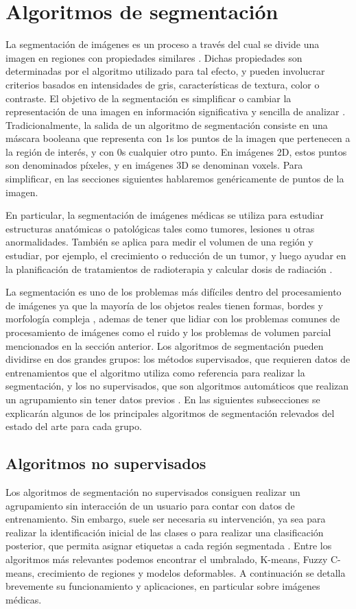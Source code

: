 \section{Algoritmos de segmentación}\label{section:algoritmos}
La segmentación de imágenes es un proceso a través del cual se divide una imagen en regiones con propiedades similares \citep{pham2000current}. Dichas propiedades son determinadas por el algoritmo utilizado para tal efecto, y pueden involucrar criterios basados en intensidades de gris, características de textura, color o contraste. El objetivo de la segmentación es simplificar o cambiar la representación de una imagen en información significativa y sencilla de analizar \citep{barghout2003perceptual}. Tradicionalmente, la salida de un algoritmo de segmentación consiste en una máscara booleana que representa con 1s los puntos de la imagen que pertenecen a la región de interés, y con 0s cualquier otro punto. En imágenes 2D, estos puntos son denominados píxeles, y en imágenes 3D se denominan voxels. Para simplificar, en las secciones siguientes hablaremos genéricamente de puntos de la imagen.

En particular, la segmentación de imágenes médicas se utiliza para estudiar estructuras anatómicas o patológicas tales como tumores, lesiones u otras anormalidades. También se aplica para medir el volumen de una región y estudiar, por ejemplo, el crecimiento o reducción de un tumor, y luego ayudar en la planificación de tratamientos de radioterapia y calcular dosis de radiación \citep{sharma2010automated}.

La segmentación es uno de los problemas más difíciles dentro del procesamiento de imágenes ya que la mayoría de los objetos reales tienen formas, bordes y morfología compleja \citep{wu2007segmentation}, ademas de tener que lidiar con los problemas comunes de procesamiento de imágenes como el ruido y los problemas de volumen parcial mencionados en la sección anterior. 
Los algoritmos de segmentación pueden dividirse en dos grandes grupos: los métodos supervisados, que requieren datos de entrenamientos que el algoritmo utiliza como referencia para realizar la segmentación, y los no supervisados, que son algoritmos automáticos que realizan un agrupamiento sin tener datos previos \citep{pham2000current}.
En las siguientes subsecciones se explicarán algunos de los principales algoritmos de segmentación relevados del estado del arte para cada grupo.

\subsection{Algoritmos no supervisados}
Los algoritmos de segmentación no supervisados consiguen realizar un agrupamiento sin interacción de un usuario para contar con datos de entrenamiento. Sin embargo, suele ser necesaria su intervención, ya sea para realizar la identificación inicial de las clases o para realizar una clasificación posterior, que permita asignar etiquetas a cada región segmentada \citep{clarke1995mri}.
Entre los algoritmos más relevantes podemos encontrar el umbralado, K-means, Fuzzy C-means, crecimiento de regiones y modelos deformables. A continuación se detalla brevemente su funcionamiento y aplicaciones, en particular sobre imágenes médicas.


